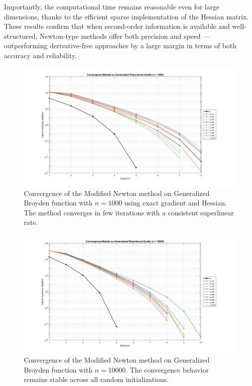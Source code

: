 \documentclass[a4paper,12pt]{article}
\begin{document}
	Importantly, the computational time remains reasonable even for large dimensions, thanks to the efficient sparse implementation of the Hessian matrix. These results confirm that when second-order information is available and well-structured, Newton-type methods offer both precision and speed — outperforming derivative-free approaches by a large margin in terms of both accuracy and reliability.
	\newpage
	\begin{figure}[H]
		\centering
		\includegraphics[width=\textwidth]{../immagini/broyden_1k.png}
		\caption{Convergence of the Modified Newton method on Generalized Broyden function with $n=1000$ using exact gradient and Hessian. The method converges in few iterations with a consistent superlinear rate.}
		\label{fig:gb_1k_exact}
	\end{figure}
	
	\begin{figure}[htbp]
		\centering
		\includegraphics[width=\textwidth]{../immagini/broyden_10k.png}
		\caption{Convergence of the Modified Newton method on Generalized Broyden function with $n=10000$. The convergence behavior remains stable across all random initializations.}
		\label{fig:gb_10k_exact}
	\end{figure}
	
\end{document}
